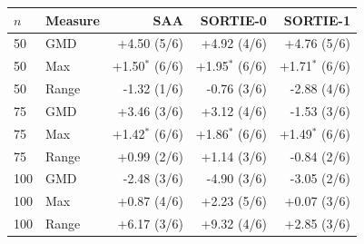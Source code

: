 \begin{tabular}{llrrr}\toprule
$n$ & Measure & SAA & SORTIE-0 & SORTIE-1 \\
\midrule
50 & GMD & +4.50 (5/6) & +4.92 (4/6) & +4.76 (5/6) \\
50 & Max & +1.50$^\ast$ (6/6) & +1.95$^\ast$ (6/6) & +1.71$^\ast$ (6/6) \\
50 & Range & -1.32 (1/6) & -0.76 (3/6) & -2.88 (4/6) \\
75 & GMD & +3.46 (3/6) & +3.12 (4/6) & -1.53 (3/6) \\
75 & Max & +1.42$^\ast$ (6/6) & +1.86$^\ast$ (6/6) & +1.49$^\ast$ (6/6) \\
75 & Range & +0.99 (2/6) & +1.14 (3/6) & -0.84 (2/6) \\
100 & GMD & -2.48 (3/6) & -4.90 (3/6) & -3.05 (2/6) \\
100 & Max & +0.87 (4/6) & +2.23 (5/6) & +0.07 (3/6) \\
100 & Range & +6.17 (3/6) & +9.32 (4/6) & +2.85 (3/6) \\
\bottomrule
\end{tabular}
